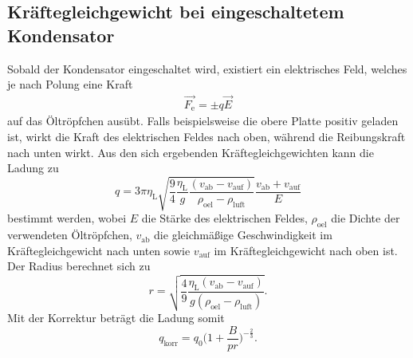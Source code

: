\subsection{Kräftegleichgewicht bei eingeschaltetem Kondensator}
Sobald der Kondensator eingeschaltet wird, existiert ein elektrisches Feld, welches je nach Polung eine Kraft
\begin{align*}
  \vec{F_\text{e}} = \pm q\vec{E}
\end{align*}
auf das Öltröpfchen ausübt.
Falls beispielsweise die obere Platte positiv geladen ist, wirkt die Kraft des elektrischen Feldes nach oben, während die Reibungskraft nach unten wirkt.
Aus den sich ergebenden Kräftegleichgewichten kann die Ladung zu
\begin{equation}
  q = 3 \pi \eta_\text{L} \sqrt{ \frac{9}{4} \frac{\eta_\text{L}}{g} \frac{ (v_\text{ab} - v_\text{auf}  )  }{\rho_\text{oel} - \rho_\text{luft}} } \frac{v_\text{ab} + v_\text{auf}}{E} \label{eqn:1}
\end{equation}
bestimmt werden, wobei $E$ die Stärke des elektrischen Feldes, $\rho_\text{oel}$ die Dichte der verwendeten Öltröpfchen, $v_\text{ab}$ die gleichmäßige Geschwindigkeit im Kräftegleichgewicht nach unten  sowie $v_\text{auf}$ im Kräftegleichgewicht nach oben ist.
Der Radius berechnet sich zu
\begin{equation}
  r = \sqrt{ \frac{4}{9} \frac{ \eta_\text{L} ( v_\text{ab} - v_\text{auf} ) }{g (\rho_\text{oel} - \rho_\text{luft}) }   }. \label{blubbr}
\end{equation}
Mit der Korrektur beträgt die Ladung somit
\begin{equation}
  q_\text{korr} = q_0 \bigl( 1 + \frac{B}{p r}  \bigr)^{-\frac{2}{3}}. \label{blubb}
\end{equation}

